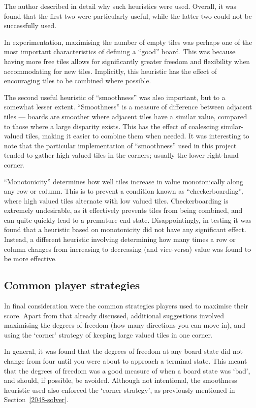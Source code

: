 \documentclass[a4paper, 11pt, titlepage]{report}
\begin{document}
The author described in detail why such heuristics were used\cite{2048explanation}. Overall, it was found that the first two were particularly useful, while the latter two could not be successfully used. 

In experimentation, maximising the number of empty tiles was perhaps one of the most important characteristics of defining a ``good'' board. This was because having more free tiles allows for significantly greater freedom and flexibility when accommodating for new tiles. Implicitly, this heuristic has the effect of encouraging tiles to be combined where possible.

The second useful heuristic of ``smoothness'' was also important, but to a somewhat lesser extent. ``Smoothness'' is a measure of difference between adjacent tiles ---  boards are smoother where adjacent tiles have a similar value, compared to those where a large disparity exists. This has the effect of coalescing similar-valued tiles, making it easier to combine them when needed. It was interesting to note that the particular implementation of ``smoothness'' used in this project tended to gather high valued tiles in the corners; usually the lower right-hand corner.

``Monotonicity'' determines how well tiles increase in value monotonically along any row or column. This is to prevent a condition known as ``checkerboarding'', where high valued tiles alternate with low valued tiles. Checkerboarding is extremely undesirable, as it effectively prevents tiles from being combined, and can quite quickly lead to a premature end-state. Disappointingly, in testing it was found that a heuristic based on monotonicity did not have any significant effect. Instead, a different heuristic involving determining how many times a row or column changes from increasing to decreasing (and vice-versa) value was found to be more effective.

\subsection{Common player strategies}
In final consideration were the common strategies\cite{threes-strategies} players used to maximise their score. Apart from that already discussed, additional suggestions involved maximising the degrees of freedom (how many directions you can move in), and using the `corner' strategy of keeping large valued tiles in one corner. 

In general, it was found that the degrees of freedom at any board state did not change from four until you were about to approach a terminal state. This meant that the degrees of freedom was a good measure of when a board state was `bad', and should, if possible, be avoided. Although not intentional, the smoothness heuristic used also enforced the `corner strategy', as previously mentioned in Section~\ref{2048-solver}.
\end{document}
